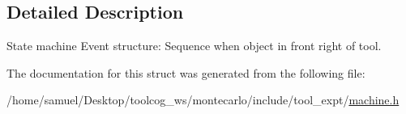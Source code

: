 \subsection{Detailed Description}
State machine Event structure\+: Sequence when object in front right of tool. 

The documentation for this struct was generated from the following file\+:\begin{DoxyCompactItemize}
\item 
/home/samuel/\+Desktop/toolcog\+\_\+ws/montecarlo/include/tool\+\_\+expt/\hyperlink{machine_8h}{machine.\+h}\end{DoxyCompactItemize}
